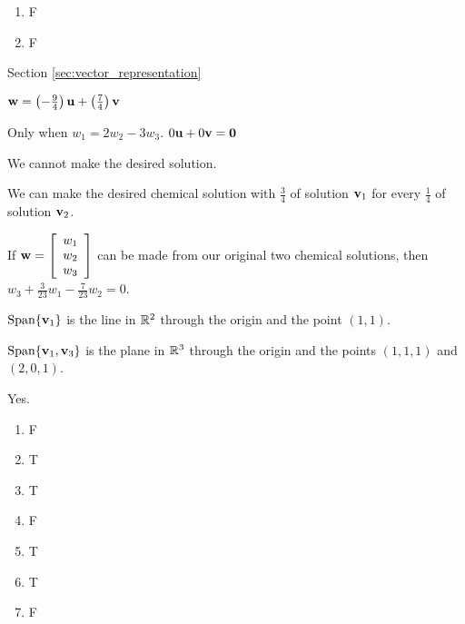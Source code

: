 \begin{multicols}{2}
\begin{enumerate}[label=(\alph*), leftmargin=1\parindent]
	\item F 

	\item F

	\end{enumerate}
\ee

\hspace{-0.25in} Section \ref{sec:vector_representation}


\obe
\item $\mathbf{w} = \left(-\frac{9}{4}\right) \mathbf{u} + \left(\frac{7}{4}\right) \mathbf{v}$

\item Only when $w_1 = 2w_2 - 3w_3$. $0 \mathbf{u} + 0\mathbf{v} = \mathbf{0}$

\item 
\ba
\item We cannot make the desired solution. 

\item We can make the desired chemical solution with $\frac{3}{4}$ of solution $\mathbf{v}_1$ for every $\frac{1}{4}$ of solution $\mathbf{v}_2$. 

\item If $\mathbf{w} = \left[ \begin{array}{c} w_1\\w_2\\w_3\end{array}\right]$ can be made from our original two chemical solutions, then $w_3+\frac{3}{23}w_1-\frac{7}{23}w_2 = 0$.  

\ea
	

\item 
\ba
\item $\text{Span}\{\mathbf{v}_1\}$ is the line in $\mathbb{R}^2$ through the origin and the point $(1,1)$. 
\item $\text{Span}\{\mathbf{v}_1,\mathbf{v}_3\}$ is the plane in $\mathbb{R}^3$ through the origin and the points $(1,1,1)$ and $(2,0,1)$. 
\ea

\item Yes. 

\item \begin{enumerate}[label=(\alph*), leftmargin=1\parindent]
\item  F
\item  T
\item  T
\item  F
\item T
\item  T
\item F
\end{enumerate}


\end{multicols}
